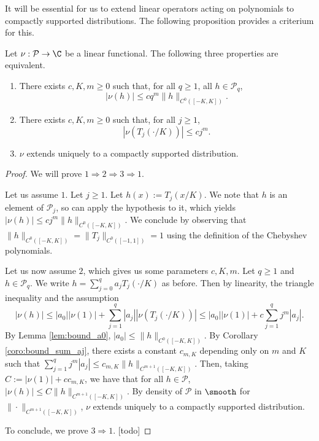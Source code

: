 It will be essential for us to extend linear operators acting on polynomials
to compactly supported distributions. The following proposition provides a criterium for this.

\begin{proposition}
  \label{prop:extension_poly_smooth}
  Let $\nu : \mathcal{P} \rightarrow \C$ be a linear functional.
  The following three properties are equivalent.
  \begin{enumerate}
    \item There exists $c, K, m \geq 0$ such that, for all $q \geq 1$, all
    $h \in \mathcal{P}_q$,
    \begin{equation*}
      |\nu(h)| \leq c q^m \|h\|_{C^0([-K,K])}.
    \end{equation*}
    \item There exists $c, K, m \geq 0$ such that, for all $j \geq 1$,
    \begin{equation*}
      |\nu(T_j(\cdot / K))| \leq c j^m.
    \end{equation*}
    \item $\nu$ extends uniquely to a compactly supported distribution.
  \end{enumerate}
\end{proposition}

\begin{proof}
  We will prove $1 \Rightarrow 2 \Rightarrow 3 \Rightarrow 1$.

  Let us assume $1$.
  Let $j \geq 1$.
  Let $h (x) := T_j(x/K)$.
  We note that $h$ is an element of $\mathcal{P}_j$, so can apply the
  hypothesis to it, which yields $|\nu(h)| \leq c j^m \|h\|_{C^0([-K,K])}$.
  We conclude by observing that $\|h\|_{C^0([-K,K])} = \|T_j\|_{C^0([-1,1])}=1$
  using the definition of the Chebyshev polynomials.

  Let us now assume $2$, which gives us some parameters $c, K, m$.
  Let $q \geq 1$ and $h \in \mathcal{P}_q$. We write $h = \sum_{j=0}^q a_j T_j(\cdot / K)$
  as before. Then by linearity, the triangle inequality and  the assumption
  \begin{equation*}
    |\nu(h)|
    \leq |a_0| |\nu(1)| + \sum_{j=1}^q |a_j| |\nu(T_j(\cdot / K))|
    \leq |a_0| |\nu(1)| + c \sum_{j=1}^q j^m|a_j|.
  \end{equation*}
  By Lemma \ref{lem:bound_a0}, $|a_0| \leq \|h\|_{C^0([-K,K])}$.
  By Corollary \ref{coro:bound_sum_aj}, there exists a constant $c_{m,K}$
  depending only on $m$ and $K$ such that
  $\sum_{j=1}^q j^m|a_j| \leq c_{m,K} \|h\|_{C^{m+1}([-K,K])}$.
  Then, taking $C := |\nu(1)| + c c_{m,K}$, we have that
  for all $h \in \mathcal{P}$,
  $|\nu(h)| \leq C \|h\|_{C^{m+1}([-K,K])}$.
  By density of $\mathcal{P}$ in $\smooth$
  for $\|\cdot \|_{C^{m+1}([-K,K])}$, $\nu$ extends uniquely to a compactly
  supported distribution.

  To conclude, we prove $3 \Rightarrow 1$. [todo]
\end{proof}

